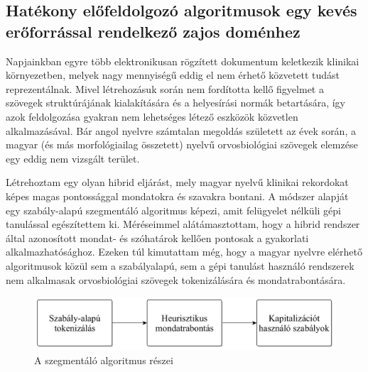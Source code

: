 \subsection{Hatékony előfeldolgozó algoritmusok egy kevés erőforrással rendelkező zajos doménhez}
\label{thes:clin}

Napjainkban egyre több elektronikusan rögzített dokumentum keletkezik klinikai környezetben, melyek nagy mennyiségű eddig el nem érhető közvetett tudást reprezentálnak. 
Mivel létrehozásuk során nem fordította kellő figyelmet a szövegek struktúrájának kialakítására és a helyesírási normák betartására, így azok feldolgozása gyakran nem lehetséges létező eszközök közvetlen alkalmazásával. 
Bár angol nyelvre számtalan megoldás született az évek során, a magyar (és más morfológiailag összetett) nyelvű orvosbiológiai szövegek elemzése egy eddig nem vizsgált terület.

% 
% 



\begin{core}
\begin{thesis}%
\label{thes:clin-segment}
Létrehoztam egy olyan hibrid eljárást, mely magyar nyelvű klinikai rekordokat képes magas pontossággal mondatokra és szavakra bontani. 
A módszer alapját egy szabály-alapú szegmentáló algoritmus képezi, amit felügyelet nélküli gépi tanulással egészítettem ki. %
Méréseimmel alátámasztottam, hogy a hibrid rendszer által azonosított mondat- és szóhatárok kellően pontosak a gyakorlati alkalmazhatósághoz.
Ezeken túl kimutattam még, hogy a magyar nyelvre elérhető algoritmusok közül sem a szabályalapú, sem a gépi tanulást használó rendszerek nem alkalmasak orvosbiológiai szövegek tokenizálására és mondatrabontására.
\end{thesis}

\begin{pub}
\cite{Orosz2013d, Orosz2014a}
\end{pub}
\end{core}


\begin{figure}[H] %
  \centering
  \includegraphics[scale=0.16]{Clinical/clin_segm_arch_hu.png} 
  \caption{A szegmentáló algoritmus részei}
  \label{fig:clin-segment-arch_en}
\end{figure}


